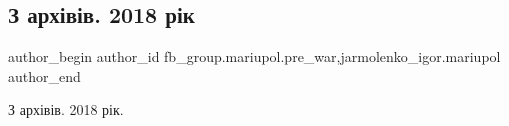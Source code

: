  
 
 
 
 

\subsection{З архівів. 2018 рік}
\label{sec:21_01_2023.fb.fb_group.mariupol.pre_war.1.z_arkh_v_v__2018_r_k}
 
\ifcmt
 author_begin
   author_id fb_group.mariupol.pre_war,jarmolenko_igor.mariupol
 author_end
\fi

З архівів. 2018 рік.
